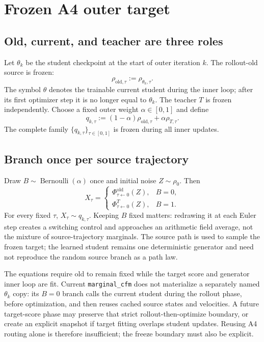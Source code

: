 \documentclass[11pt,a4paper]{article}
\newcommand{\old}{\mathrm{old}}
\theoremstyle{plain}
\theoremstyle{definition}
\begin{document}
\section{Frozen A4 outer target}
\label{sec:a4}

\subsection{Old, current, and teacher are three roles}

Let $\theta_k$ be the student checkpoint at the start of outer iteration $k$.  The rollout-old
source is frozen:
\[
\rho_{\old,\tau}:=\rho_{\theta_k,\tau}.
\]
The symbol $\theta$ denotes the trainable current student during the inner loop; after its first
optimizer step it is no longer equal to $\theta_k$.  The teacher $T$ is frozen independently.
Choose a fixed outer weight $\alpha\in[0,1]$ and define
\begin{equation}
q_{k,\tau}
:=(1-\alpha)\rho_{\old,\tau}+\alpha\rho_{T,\tau}.
\label{eq:outer-target}
\end{equation}
The complete family $\{q_{k,\tau}\}_{\tau\in[0,1]}$ is frozen during all inner updates.

\subsection{Branch once per source trajectory}

Draw $B\sim\operatorname{Bernoulli}(\alpha)$ once and initial noise $Z\sim\rho_0$.  Then
\begin{equation}
X_\tau=
\begin{cases}
\Phi^{\old}_{\tau\leftarrow0}(Z), & B=0,\\
\Phi^{T}_{\tau\leftarrow0}(Z), & B=1.
\end{cases}
\label{eq:branch-source}
\end{equation}
For every fixed $\tau$, $X_\tau\sim q_{k,\tau}$.  Keeping $B$ fixed matters: redrawing it at each
Euler step creates a switching control and approaches an arithmetic field average, not the
mixture of source-trajectory marginals.  The source path is used to sample the frozen target;
the learned student remains one deterministic generator and need not reproduce the random
source branch as a path law.

\begin{tcolorbox}[colback=blue!4,colframe=oldblue,title=Mathematical old versus the shipped A4 phase boundary]
The equations require old to remain fixed while the target score and generator inner loop are
fit.  Current \texttt{marginal\_cfm} does not materialize a separately named $\theta_k$ copy:
its $B=0$ branch calls the current student during the rollout phase, before optimization, and
then reuses cached source states and velocities.  A future target-score phase may preserve that
strict rollout-then-optimize boundary, or create an explicit snapshot if target fitting overlaps
student updates.  Reusing A4 routing alone is therefore insufficient; the freeze boundary must
also be explicit.
\end{tcolorbox}
\end{document}
